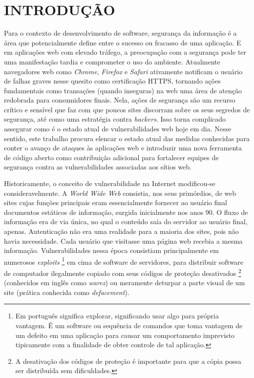 \chapter{INTRODUÇÃO}

Para o contexto de desenvolvimento de software, segurança da informação é a área que potencialmente define entre o sucesso ou fracasso de uma aplicação. E em aplicações web com elevado tráfego, a preocupação com a segurança pode ter uma manifestação tardia e comprometer o uso do ambiente. Atualmente navegadores web como \textit{Chrome}, \textit{Firefox} e \textit{Safari} ativamente notificam o usuário de falhas graves nesse quesito como certificação HTTPS, tornando ações fundamentais como transações (quando inseguras) na web uma área de atenção redobrada para consumidores finais. Nela, ações de segurança são um recurso crítico e sensível que faz com que poucos sites discorram sobre os seus segredos de segurança, até como uma estratégia contra \textit{hackers}. Isso torna complicado assegurar como é o estado atual de vulnerabilidades web hoje em dia. Nesse sentido, este trabalho procura elencar o estado atual das medidas conhecidas para conter o avanço de ataques às aplicações web e introduzir uma nova ferramenta de código aberto como contribuição adicional para fortalecer equipes de segurança contra as vulnerabilidades associadas aos sítios web. 

Historicamente, o conceito de vulnerabilidade na Internet modificou-se consideravelmente. A \textit{World Wide Web} consistia, nos seus primórdios, de web sites cujas funções principais eram essencialmente fornecer ao usuário final documentos estáticos de informação, surgida inicialmente nos anos 90. O fluxo de informação era de via única, no qual o conteúdo saía do servidor ao usuário final, apenas. Autenticação não era uma realidade para a maioria dos sites, pois não havia necessidade. Cada usuário que visitasse uma página web recebia a mesma informação. \cite{stuttard_web_nodate} Vulnerabilidades nessa época consistiam principalmente em numerosos \textit{exploits} \footnote{Em português significa explorar, significando usar algo para própria vantagem. É um software ou sequência de comandos que toma vantagem de um defeito em uma aplicação para causar um comportamento imprevisto tipicamente com a finalidade de obter controle de tal aplicação. } em cima de software de servidores, para distribuir software de computador ilegalmente copiado com seus códigos de proteção desativados \footnote{A desativação dos códigos de proteção é importante para que a cópia possa ser distribuída sem dificuldades.} (conhecidos em inglês como \textit{warez}) ou meramente deturpar a parte visual de um site (prática conhecida como \textit{defacement}).

